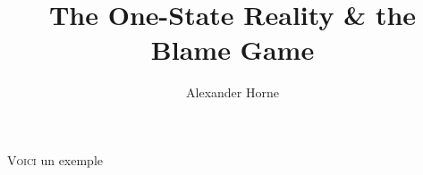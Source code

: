 \documentclass[letterpaper,12pt,twoside]{article} %
\title{\Huge The One-State Reality \& the Blame Game}
\author{\large Alexander Horne}
\date{} %
\begin{document}
\maketitle

\begin{multicols}{2}

\lettrine[lraise=0.1, nindent=0em, slope=-.5em]{V}{oici} un exemple \lipsum \autocite[17]{omalley2017israel}

\end{multicols}

\nocite{kelman2018onetwo}
\nocite{lustick2019paradgim}
\nocite{kear2022wasatiyyah}
\nocite{omalley2017israel}
\nocite{scheindlin2016confederalism}
\nocite{munayyer2019there}
\nocite{gordon2012western}
\nocite{farsakh2011one}

\vfill
\pagebreak
\printbibliography
\end{document}
